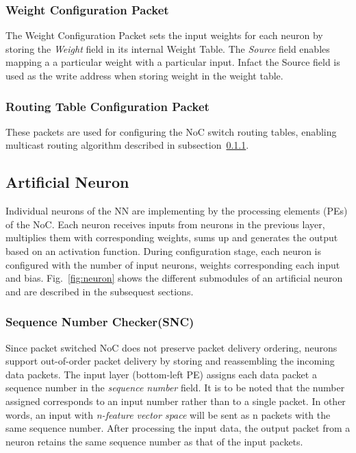 \subsubsection*{\bf Weight Configuration Packet}
The Weight Configuration Packet sets the input weights for each neuron by storing the \emph{Weight} field in its internal Weight Table.
The \emph{Source} field enables mapping a a particular weight with a particular input.
Infact the Source field is used as the write address when storing weight in the weight table.
\subsubsection*{\bf Routing Table Configuration Packet}
These packets are used for configuring the NoC switch routing tables, enabling multicast routing algorithm described in subsection~\ref{}.

\subsection{Artificial Neuron}
Individual neurons of the NN are implementing by the processing elements (PEs) of the NoC.
Each neuron receives inputs from neurons in the previous layer, multiplies them with corresponding weights, sums up and generates the output based on an activation function.
During configuration stage, each neuron is configured with the number of input neurons, weights corresponding each input and bias.
Fig.~\ref{fig:neuron} shows the different submodules of an artificial neuron and are described in the subsequest sections.
\subsubsection{\bf Sequence Number Checker(SNC)}
 
Since packet switched NoC does not preserve packet delivery ordering, neurons support out-of-order packet delivery by storing and reassembling the incoming data packets. 
The input layer (bottom-left PE) assigns each data packet a sequence number in the \emph{sequence number} field. 
It is to be noted that the number assigned corresponds to an input number rather than to a single packet.
In other words, an input with \emph{n-feature vector space} will be sent as n packets with the same sequence number. 
After processing the input data, the output packet from a neuron retains the same sequence number as that of the input packets. 

